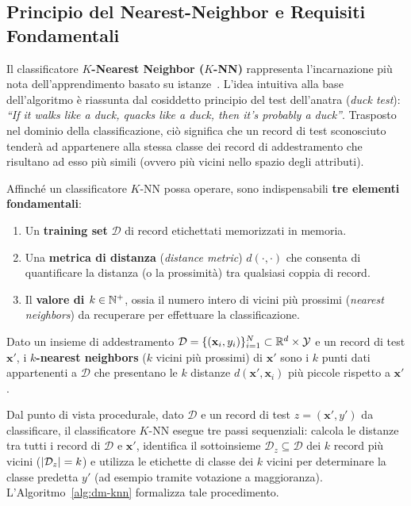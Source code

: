 \FloatBarrier
\subsection{Principio del Nearest-Neighbor e Requisiti Fondamentali}
\label{subsec:dm-knn-principle}

Il classificatore \textbf{$K$-Nearest Neighbor ($K$-NN)} rappresenta l'incarnazione pi\`u nota dell'apprendimento basato su istanze~\cite{tan2018}. L'idea intuitiva alla base dell'algoritmo \`e riassunta dal cosiddetto principio del test dell'anatra (\textit{duck test}): \textit{``If it walks like a duck, quacks like a duck, then it's probably a duck''}. Trasposto nel dominio della classificazione, ci\`o significa che un record di test sconosciuto tender\`a ad appartenere alla stessa classe dei record di addestramento che risultano ad esso pi\`u simili (ovvero pi\`u vicini nello spazio degli attributi).

Affinch\'e un classificatore $K$-NN possa operare, sono indispensabili \textbf{tre elementi fondamentali}:
\begin{enumerate}
    \item Un \textbf{training set} $\mathcal{D}$ di record etichettati memorizzati in memoria.
    \item Una \textbf{metrica di distanza} (\textit{distance metric}) $d(\cdot, \cdot)$ che consenta di quantificare la distanza (o la prossimit\`a) tra qualsiasi coppia di record.
    \item Il \textbf{valore di $k \in \mathbb{N}^+$}, ossia il numero intero di vicini pi\`u prossimi (\textit{nearest neighbors}) da recuperare per effettuare la classificazione.
\end{enumerate}

\begin{definition}
Dato un insieme di addestramento $\mathcal{D} = \{(\mathbf{x}_i, y_i)\}_{i=1}^N \subset \mathbb{R}^d \times \mathcal{Y}$ e un record di test $\mathbf{x}'$, i \textbf{$k$-nearest neighbors} ($k$ vicini pi\`u prossimi) di $\mathbf{x}'$ sono i $k$ punti dati appartenenti a $\mathcal{D}$ che presentano le $k$ distanze $d(\mathbf{x}', \mathbf{x}_i)$ pi\`u piccole rispetto a $\mathbf{x}'$.
\end{definition}

Dal punto di vista procedurale, dato $\mathcal{D}$ e un record di test $z = (\mathbf{x}', y')$ da classificare, il classificatore $K$-NN esegue tre passi sequenziali: calcola le distanze tra tutti i record di $\mathcal{D}$ e $\mathbf{x}'$, identifica il sottoinsieme $\mathcal{D}_z \subseteq \mathcal{D}$ dei $k$ record pi\`u vicini ($\left|\mathcal{D}_z\right| = k$) e utilizza le etichette di classe dei $k$ vicini per determinare la classe predetta $y'$ (ad esempio tramite votazione a maggioranza). L'Algoritmo~\ref{alg:dm-knn} formalizza tale procedimento.

